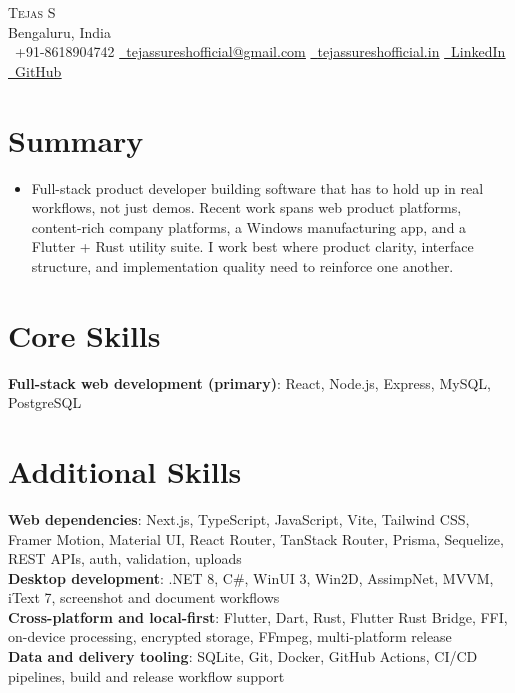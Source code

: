 \documentclass[letterpaper,11pt]{article}
\newcommand{\resumeItem}[1]{\item\small{{#1 \vspace{-2pt}}}}
\newcommand{\resumeSubHeadingListStart}{\begin{itemize}[leftmargin=0.0in, label={}]}
\newcommand{\resumeSubHeadingListEnd}{\end{itemize}}
\begin{document}
\begin{center}
  {\Huge \scshape Tejas S}\\[-2pt]
  {\small Bengaluru, India}\\[3pt]
  {\small
    \faPhone\ +91-8618904742 \quad
    \href{mailto:tejassureshofficial@gmail.com}{\faEnvelope\ \underline{tejassureshofficial@gmail.com}} \quad
    \href{https://tejassureshofficial.in}{\faGlobe\ \underline{tejassureshofficial.in}} \quad
    \href{https://www.linkedin.com/in/tejas-s-57138816a/}{\faLinkedin\ \underline{LinkedIn}} \quad
    \href{https://github.com/Tez861910}{\faGithub\ \underline{GitHub}}
  }
\end{center}
\vspace{-8pt}

\section{Summary}
\resumeSubHeadingListStart
  \resumeItem{Full-stack product developer building software that has to hold up in real workflows, not just demos. Recent work spans web product platforms, content-rich company platforms, a Windows manufacturing app, and a Flutter + Rust utility suite. I work best where product clarity, interface structure, and implementation quality need to reinforce one another.}
\resumeSubHeadingListEnd
\vspace{-12pt}

\section{Core Skills}
\begin{itemize}[leftmargin=0.15in, label={}]
  \small{\item{
    \textbf{Full-stack web development (primary)}{: React, Node.js, Express, MySQL, PostgreSQL}
  }}
\end{itemize}
\vspace{-10pt}

\section{Additional Skills}
\begin{itemize}[leftmargin=0.15in, label={}]
  \small{\item{
    \textbf{Web dependencies}{: Next.js, TypeScript, JavaScript, Vite, Tailwind CSS, Framer Motion, Material UI, React Router, TanStack Router, Prisma, Sequelize, REST APIs, auth, validation, uploads} \\
    \textbf{Desktop development}{: .NET 8, C\#, WinUI 3, Win2D, AssimpNet, MVVM, iText 7, screenshot and document workflows} \\
    \textbf{Cross-platform and local-first}{: Flutter, Dart, Rust, Flutter Rust Bridge, FFI, on-device processing, encrypted storage, FFmpeg, multi-platform release} \\
    \textbf{Data and delivery tooling}{: SQLite, Git, Docker, GitHub Actions, CI/CD pipelines, build and release workflow support}
  }}
\end{itemize}
\vspace{-14pt}
\end{document}
